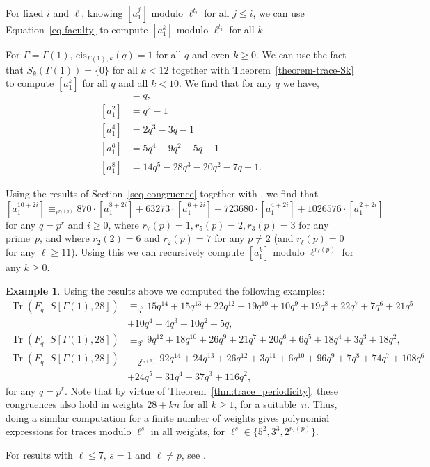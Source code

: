 \documentclass[10pt]{article}
\theoremstyle{definition}
\newtheorem{example}[theorem]{Example}
\DeclareMathOperator\Tr{Tr}
\renewcommand{\:}{\colon}
\begin{document}
For fixed $i$ and $\ell$, knowing $[a_1^j]$ modulo $\ell^{t_i}$ for all $j \leq i$, we can use Equation~\eqref{eq-faculty} to compute $[a_1^k]$ modulo $\ell^{t_i}$ for all $k$. 

For $\Gamma=\Gamma(1)$, $\mathrm{eis}_{\Gamma(1),k}(q)=1$ for all $q$ and even $k \geq 0$. We can use the fact that $S_{k}(\Gamma(1))=\{0\}$ for all $k<12$ together with Theorem~\ref{theorem-trace-Sk} to compute $[a_1^{k}]$ for all $q$ and all $k <10$.
We find that for any $q$ we have,  
\begin{align*}
[a_1^0]&=q, \\
[a_1^2]&=q^2-1 \\
[a_1^4]&=2q^3-3q-1\\
[a_1^6]&=5q^4-9q^2-5q-1 \\
[a_1^8]&=14q^5-28q^3-20q^2-7q-1.
\end{align*}

Using the results of Section~\ref{seq-congruence} together with \cite[Theorem~10.1]{silverman}, we find that 
 \[
 [a_1^{10+2i}] \equiv_{\ell^{r_{\ell}(p)}} 870\cdot [a_1^{8+2i}]+63273\cdot[a_1^{6+2i}]+723680\cdot[a_1^{4+2i}]+1026576\cdot[a_1^{2+2i}]
 \]
for any $q=p^r$ and $i \geq 0$, where $r_7(p)=1,r_5(p)=2,r_3(p)=3$ for any prime~$p$, and where $r_2(2)=6$ and $r_2(p)=7$ for any $p \neq 2$ (and $r_{\ell}(p) = 0$ for any $\ell \geq 11$).
Using this we can recursively compute $[a_1^k]$ modulo $\ell^{r_{\ell}(p)}$ for any $k \geq 0$. 

 \begin{example}\label{ex:elliptic_wt28}
 Using the results above we computed the following examples: 
\begin{align*}
\Tr(F_q \, | \, S[\Gamma(1),28]) &\equiv_{5^2} 15q^{14}+15q^{13}+22q^{12}+19q^{10}+10q^9+19q^8+22q^7+7q^6+21q^5\\ &+10q^4+4q^3+10q^2+5q,\\
\Tr(F_q \, | \, S[\Gamma(1),28]) &\equiv_{3^3} 9q^{12}+18q^{10}+26q^9+21q^7+20q^6+6q^5+18q^4+3q^3+18q^2,\\
\Tr(F_q \, | \, S[\Gamma(1),28]) &\equiv_{2^{r_2(p)}} 92q^{14}+24q^{13}+26q^{12}+3q^{11}+6q^{10}+96q^9+7q^8+74q^7+108q^6\\&+24q^5+31q^4+37q^3+116q^2,
\end{align*} 
for any $q=p^r$.
Note that by virtue of Theorem~\ref{thm:trace_periodicity}, these congruences also hold in weights $28+kn$ for all $k \geq 1$, for a suitable~$n$. Thus, doing a similar computation for a finite number of weights gives polynomial expressions for traces modulo $\ell^s$ in all weights, for $\ell^s \in \{5^2,3^3,2^{r_2(p)}\}$.

For results with $\ell \leq 7$, $s=1$ and $\ell \neq p$, see  
\cite[Theorem~2a]{CFW}.
  \end{example}
\end{document}
